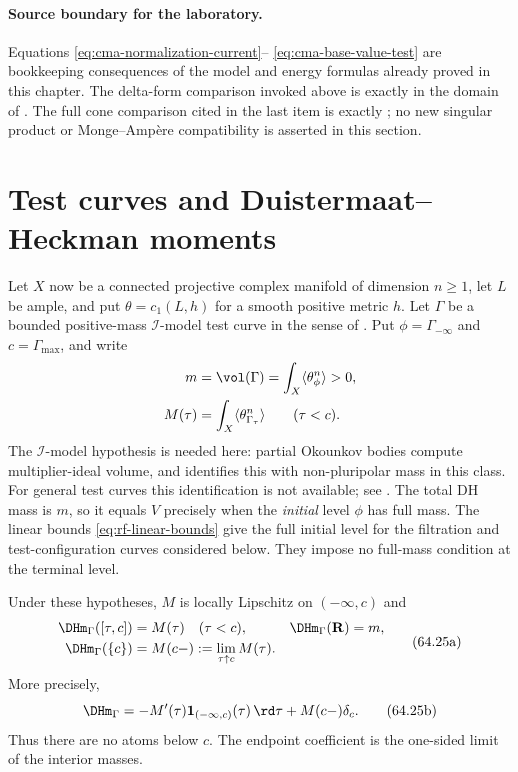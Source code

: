 \paragraph{Source boundary for the laboratory.}
Equations \eqref{eq:cma-normalization-current}--
\eqref{eq:cma-base-value-test} are bookkeeping consequences of the model
and energy formulas already proved in this chapter.  The delta-form
comparison invoked above is exactly \cite{GK17,GK19} in the domain of
.  The full cone comparison cited in the last
item is exactly ; no new singular
product or Monge--Amp\`ere compatibility is asserted in this section.

\section{Test curves and Duistermaat--Heckman moments}
\label{sec:cma-dh}

Let $X$ now be a connected projective complex manifold of dimension
$n\geq1$, let $L$ be ample, and put $\theta=c_1(L,h)$ for a smooth
positive metric $h$. Let $\Gamma$ be a bounded positive-mass
$\mathcal I$-model test curve in the sense of
. Put $\phi=\Gamma_{-\infty}$ and
$c=\Gamma_{\max}$, and write
\[
 \begin{aligned}
 m&=\vol(\Gamma)=\int_X\langle\theta_\phi^n\rangle>0,\\
 M(\tau)&=\int_X\langle\theta_{\Gamma_\tau}^n\rangle
                 \qquad(\tau<c).
 \end{aligned}
\]
The $\mathcal I$-model hypothesis is needed here: partial Okounkov bodies
compute multiplier-ideal volume, and
 identifies this with non-pluripolar
mass in this class. For general test curves this identification is not
available; see .
The total DH mass is $m$, so it equals $V$ precisely when the
\emph{initial} level $\phi$ has full mass. The linear bounds
\eqref{eq:rf-linear-bounds} give the full initial level for the filtration
and test-configuration curves considered below. They impose no full-mass
condition at the terminal level.

\begin{proposition}\label{prop:cma-dh-tail-density}
Under these hypotheses, $M$ is locally Lipschitz on $(-\infty,c)$ and
\[
 \begin{aligned}
 \DHm_\Gamma([\tau,c])&=M(\tau)\quad(\tau<c),
              &\DHm_\Gamma(\mathbf R)&=m,\\
 \DHm_\Gamma(\{c\})&=M(c-):=\lim_{\tau\uparrow c}M(\tau).
 \end{aligned}
 \tag{64.25a}\label{eq:cma-dh-tail}
\]
More precisely,
\[
 \DHm_\Gamma
 =-M'(\tau)\mathbf 1_{(-\infty,c)}(\tau)\,\rd\tau
   +M(c-)\delta_c.
 \tag{64.25b}\label{eq:cma-dh-density}
\]
Thus there are no atoms below $c$. The endpoint coefficient is the
one-sided limit of the interior masses.
\end{proposition}

